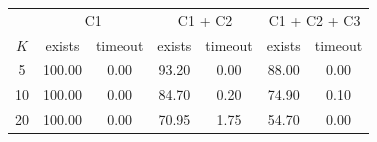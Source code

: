 \begin{tabular}{ccccccc}
\toprule
 & \multicolumn{2}{c}{C1} & \multicolumn{2}{c}{C1 + C2} & \multicolumn{2}{c}{C1 + C2 + C3} \\
$K$ & exists & timeout & exists & timeout & exists & timeout \\
\midrule
5 & 100.00 & 0.00 & 93.20 & 0.00 & 88.00 & 0.00 \\
10 & 100.00 & 0.00 & 84.70 & 0.20 & 74.90 & 0.10 \\
20 & 100.00 & 0.00 & 70.95 & 1.75 & 54.70 & 0.00 \\
\bottomrule
\end{tabular}
